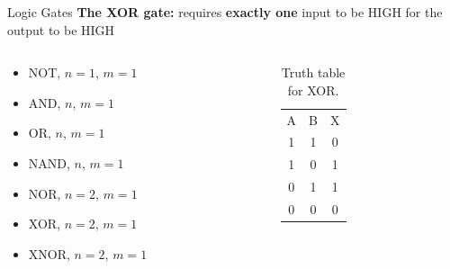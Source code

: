 \documentclass{beamer}
\begin{document}
\begin{frame}{Logic Gates}
\textbf{The XOR gate:} requires \textbf{exactly one} input to be HIGH for the output to be HIGH \\ \vspace{0.5cm}
\begin{columns}[T]
\begin{column}{0.5\textwidth}
\begin{itemize}
\item \alert{NOT, $n=1$, $m=1$}
\item \alert{AND, $n$, $m=1$}
\item \alert{OR, $n$, $m=1$}
\item \alert{NAND, $n$, $m=1$}
\item \alert{NOR, $n=2$, $m=1$}
\item \alert{XOR, $n=2$, $m=1$}
\item XNOR, $n=2$, $m=1$
\end{itemize}
\end{column}
\begin{column}{0.5\textwidth}
\begin{table}
\begin{tabular}{c c c}
A & B & X \\
1 & 1 & 0 \\
1 & 0 & 1 \\
0 & 1 & 1 \\
0 & 0 & 0
\end{tabular}
\caption{\label{tab:XOR} Truth table for XOR.}
\end{table}
\end{column}
\end{columns}
\end{frame}
\end{document}
